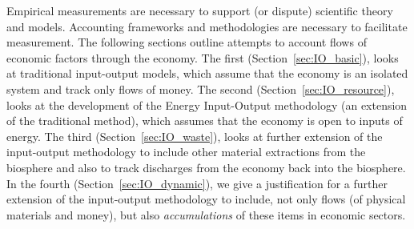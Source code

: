 Empirical measurements are necessary to support
(or dispute) scientific theory and models.
Accounting frameworks and methodologies are necessary
to facilitate measurement.
The following sections outline attempts to
account flows of economic factors through the
economy. 
The first (Section~\ref{sec:IO_basic}),
looks at traditional input-output models, 
which assume that the economy is an isolated system 
and track only flows of money.
The second (Section~\ref{sec:IO_resource}),
looks at the development of the Energy Input-Output methodology
(an extension of the traditional method),
which assumes that the economy is open to inputs of energy.
The third (Section~\ref{sec:IO_waste}),
looks at further extension of the input-output methodology
to include other material extractions from the biosphere and also
to track discharges from the economy back into the biosphere.
In the fourth (Section~\ref{sec:IO_dynamic}),
we give a justification for a further extension of the input-output
methodology to include,
not only flows (of physical materials and money),
but also \emph{accumulations} of these items
in economic sectors.
%
%
%
%
%
%



